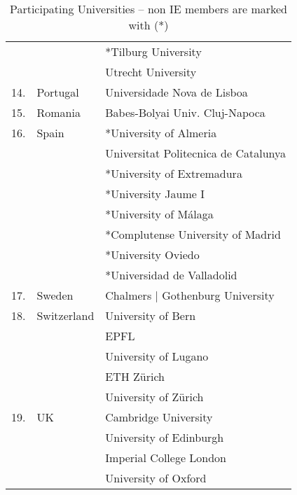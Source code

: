 \begin{table}
\begin{center}
\begin{tabular}  {|r|l|l|}
& & *Tilburg University \\   
& &  Utrecht University \\
 \hline
14.& Portugal  & Universidade Nova de Lisboa \\
 \hline
15.&Romania  & Babes-Bolyai Univ. Cluj-Napoca \\
\hline
16.&Spain  & *University of Almeria \\
&  & Universitat Politecnica de Catalunya \\
&  &  *University of Extremadura\\
&  &  *University Jaume I\\
&    & *University of M\' alaga \\
&  &  *Complutense University of Madrid\\
&  &  *University Oviedo\\
&  & *Universidad de Valladolid \\
\hline
17.& Sweden   &  Chalmers | Gothenburg University\\
\hline
18.&Switzerland   & University of Bern\\
& & EPFL \\
&  &  University of Lugano \\
 &    & ETH Z\" urich \\
&   &  University of Z\" urich\\
\hline
19.&UK   &  Cambridge University\\
&   &  University of Edinburgh\\
 &  & Imperial College London\\
&  & University of Oxford \\
\hline
\end{tabular}
\vspace*{0.4cm}
\end{center}
\caption{Participating Universities -- non IE members are marked with (*)}
\label{tab:names}
\end{table}

